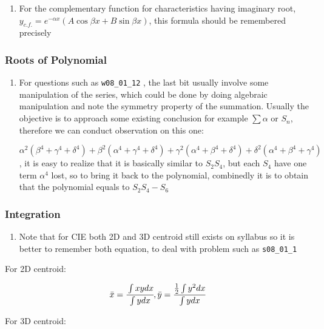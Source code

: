 \documentclass[]{article}
\begin{document}
\begin{enumerate}
\def\labelenumi{\arabic{enumi}.}
\item
  For the complementary function for characteristics having imaginary
  root, \(y_{c.f.} = e^{-\alpha x} (A\cos\beta x + B\sin \beta x)\),
  this formula should be remembered precisely
\end{enumerate}

\subsubsection{Roots of Polynomial}\label{header-n124}

\begin{enumerate}
\def\labelenumi{\arabic{enumi}.}
\item
  For questions such as \texttt{w08\_01\_12} , the last bit usually
  involve some manipulation of the series, which could be done by doing
  algebraic manipulation and note the symmetry property of the
  summation. Usually the objective is to approach some existing
  conclusion for example \(\sum \alpha\) or \(S_n\), therefore we can
  conduct observation on this one:

  \( \alpha^2 (\beta^4 + \gamma^4 + \delta^4) + \beta^2 (\alpha^4 + \gamma^4 + \delta^4) + \gamma^2 (\alpha^4 + \beta^4 +  \delta^4) + \delta^2(\alpha^4 + \beta^4 + \gamma^4)\)
  , it is easy to realize that it is basically similar to \(S_2 S_4\),
  but each \(S_4\) have one term \(\alpha^4\) lost, so to bring it back
  to the polynomial, combinedly it is to obtain that the polynomial
  equals to \(S_2S_4 - S_6\)
\end{enumerate}

\subsubsection{Integration}\label{header-n157}

\begin{enumerate}
\def\labelenumi{\arabic{enumi}.}
\item
  Note that for CIE both 2D and 3D centroid still exists on syllabus so
  it is better to remember both equation, to deal with problem such as
  \texttt{s08\_01\_1}
\end{enumerate}

For 2D centroid:

\[\bar{x} = \cfrac{\int{xy}dx}{\int y dx}, \bar{y} = \cfrac{\frac{1}{2}\int y^2 dx}{\int y dx}\]

For 3D centroid:
\end{document}

